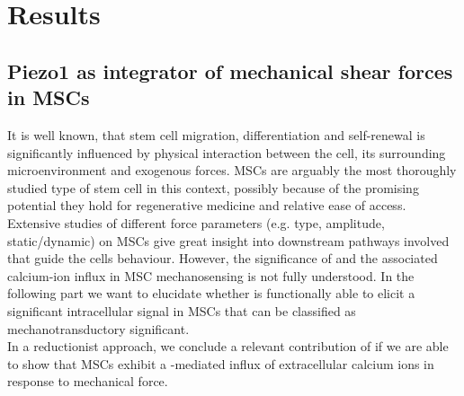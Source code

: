 \chapter{Results}



\section{Piezo1 as integrator of mechanical shear forces in MSCs}
\label{sec:piezo1-as-integrator-of-biomecshanical-events-in-mscs}

It is well known, that stem cell migration, differentiation and self-renewal is significantly influenced by physical interaction between the cell, its surrounding microenvironment and exogenous forces. \cite{Eyckmans2011, Lee2011} MSCs are arguably the most thoroughly studied type of stem cell in this context, possibly because of the promising potential they hold for regenerative medicine and relative ease of access. Extensive studies of different force parameters (e.g. type, amplitude, static/dynamic) on MSCs give great insight into downstream pathways involved that guide the cells behaviour. However, the significance of \Piezo{} and the associated calcium-ion influx in MSC mechanosensing is not fully understood. In the following part we want to elucidate whether \Piezo{} is functionally able to elicit a significant intracellular signal in MSCs that can be classified as mechanotransductory significant.\\
In a reductionist approach, we conclude a relevant contribution of \Piezo{} if we are able to show that MSCs exhibit a \Piezo{}-mediated influx of extracellular calcium ions in response to mechanical force.\\

